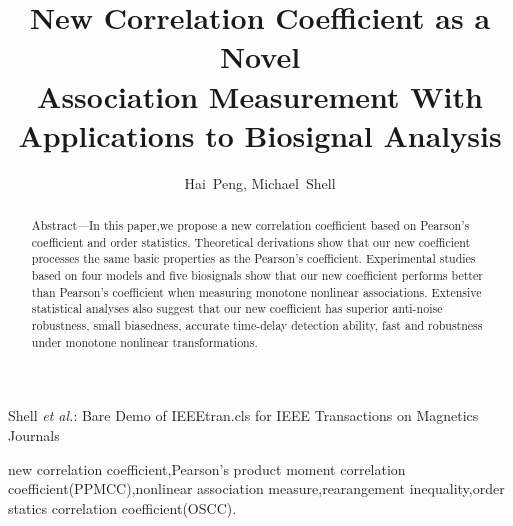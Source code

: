 \documentclass[journal]{IEEEtran}
\begin{document}
\title{New Correlation Coefficient as a Novel\\Association Measurement With Applications to Biosignal Analysis}

\author{Hai~Peng,
        Michael~Shell}

%
    {Shell \MakeLowercase{\textit{et al.}}: Bare Demo of IEEEtran.cls for IEEE Transactions on Magnetics Journals}

\maketitle

\begin{abstract}
    Abstract—In this paper,we propose a new correlation coefficient
    based on Pearson’s coefficient and order statistics.
    Theoretical derivations show that our new coefficient processes
    the same basic properties as the Pearson’s coefficient.
    Experimental studies based on four models and five biosignals
    show that our new coefficient performs better than Pearson’s
    coefficient when measuring monotone nonlinear associations.
    Extensive statistical analyses also suggest that our new
    coefficient has superior anti-noise robustness, small biasedness,
    accurate time-delay detection ability, fast and robustness
    under monotone nonlinear transformations.
\end{abstract}

\begin{IEEEkeywords}
    new correlation coefficient,Pearson's product moment correlation coefficient(PPMCC),nonlinear association measure,rearangement inequality,order statics correlation coefficient(OSCC).
\end{IEEEkeywords}

\IEEEpeerreviewmaketitle
\end{document}
